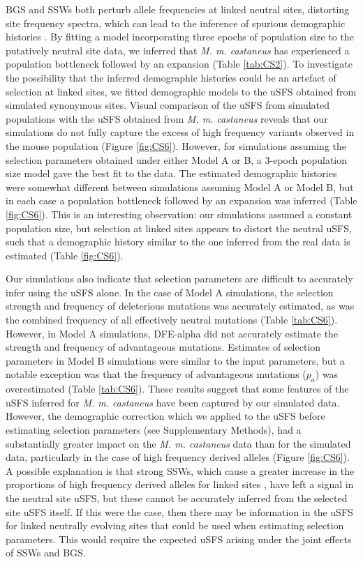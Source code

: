 	BGS and SSWs both perturb allele frequencies at linked neutral sites, distorting site frequency spectra, which can lead to the inference of spurious demographic histories \citep{RN149, RN241, RN242}. By fitting a model incorporating three epochs of population size to the putatively neutral site data, we inferred that \textit{M. m. castaneus} has experienced a population bottleneck followed by an expansion (Table \ref{tab:CS2}). To investigate the possibility that the inferred demographic histories could be an artefact of selection at linked sites, we fitted demographic models to the uSFS obtained from simulated synonymous sites. Visual comparison of the uSFS from simulated populations with the uSFS obtained from \textit{M. m. castaneus} reveals that our simulations do not fully capture the excess of high frequency variants observed in the mouse population (Figure \ref{fig:CS6}). However, for simulations assuming the selection parameters obtained under either Model A or B, a 3-epoch population size model gave the best fit to the data. The estimated demographic histories were somewhat different between simulations assuming Model A or Model B, but in each case a population bottleneck followed by an expansion was inferred (Table \ref{fig:CS6}). This is an interesting observation: our simulations assumed a constant population size, but selection at linked sites appears to distort the neutral uSFS, such that a demographic history similar to the one inferred from the real data is estimated (Table \ref{fig:CS6}).  

	Our simulations also indicate that selection parameters are difficult to accurately infer using the uSFS alone. In the case of Model A simulations, the selection strength and frequency of deleterious mutations was accurately estimated, as was the combined frequency of all effectively neutral mutations (Table \ref{tab:CS6}). However, in Model A simulations, DFE-alpha did not accurately estimate the strength and frequency of advantageous mutations. Estimates of selection parameters in Model B simulations were similar to the input parameters, but a notable exception was that the frequency of advantageous mutations ($p_a$) was overestimated (Table \ref{tab:CS6}). These results suggest that some features of the uSFS inferred for \textit{M. m. castaneus} have been captured by our simulated data. However, the demographic correction which we applied to the uSFS before estimating selection parameters (see Supplementary Methods), had a substantially greater impact on the \textit{M. m. castaneus} data than for the simulated data, particularly in the case of high frequency derived alleles (Figure \ref{fig:CS6}). A possible explanation is that strong SSWs, which cause a greater increase in the proportions of high frequency derived alleles for linked sites \citep{RN343}, have left a signal in the neutral site uSFS, but these cannot be accurately inferred from the selected site uSFS itself. If this were the case, then there may be information in the uSFS for linked neutrally evolving sites that could be used when estimating selection parameters. This would require the expected uSFS arising under the joint effects of SSWs and BGS.

